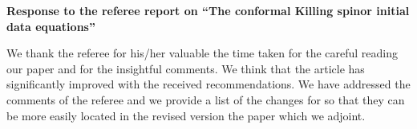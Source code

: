 \documentclass[a4paper,10pt]{article}
\theoremstyle{plain}
\newcommand{\myrule} [3] []{
    \begin{center}
        \begin{tikzpicture}
            \draw[#2-#3, ultra thick, #1] (0,0) to (0.5\linewidth,0);
        \end{tikzpicture}
    \end{center}
}
\renewcommand{\title}[1]{{\bfseries #1}\par}
\renewcommand{\author}[1]{\medskip{#1}\par\smallskip}
\newcommand{\affiliation}[1]{{\itshape #1}\par}
\newcommand{\email}[1]{E-mail:~\texttt{#1}\par}
\numberwithin{equation}{section}
\begin{document}
\begin{center}
  \title{\LARGE Response to the referee report on ``The conformal Killing spinor initial data equations''
  \\ \vspace{0.5cm} \Large
  }
\vspace{3mm}
\author{\large }

\vspace{1mm}
\end{center}

%
\vspace{2mm}

 
%
%
%

We thank the referee for his/her valuable the time taken
for the careful reading our paper and for the insightful comments. We think that the article has significantly improved
with the received recommendations. We have addressed the comments of the referee and we provide a list of the changes for so that
they can be more easily located in the revised version the paper which we adjoint.
\end{document}
